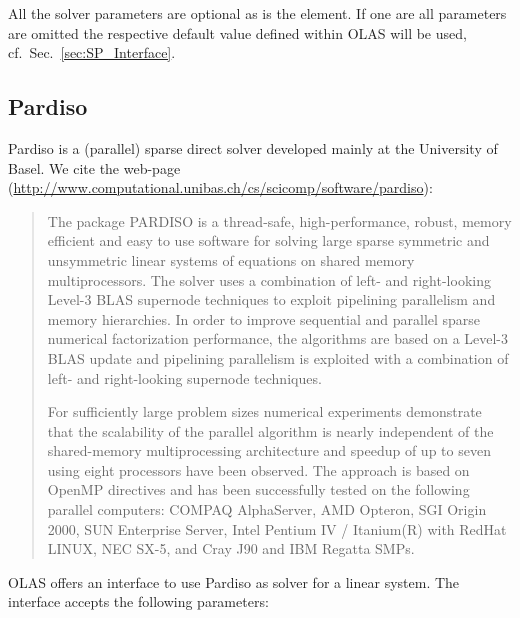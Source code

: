 All the solver parameters are optional as is the  element. If one are
all parameters are omitted the respective default value defined within OLAS
will be used, cf.~Sec.~\ref{sec:SP_Interface}.
%
%
\subsection{Pardiso}
%
%
Pardiso is a (parallel) sparse direct solver developed mainly at the University
of Basel. We cite the web-page
(\url{http://www.computational.unibas.ch/cs/scicomp/software/pardiso}):
%
%
\begin{quote}
The package PARDISO is a thread-safe, high-performance, robust, memory efficient and easy to use software for solving large sparse symmetric and unsymmetric linear systems of equations on shared memory multiprocessors. The solver uses a combination of left- and right-looking Level-3 BLAS supernode techniques to exploit pipelining parallelism and memory hierarchies. In order to improve sequential and parallel sparse numerical factorization performance, the algorithms are based on a Level-3 BLAS update and pipelining parallelism is exploited with a combination of left- and right-looking supernode techniques.

For sufficiently large problem sizes numerical experiments demonstrate that the scalability of the parallel algorithm is nearly independent of the shared-memory multiprocessing architecture and speedup of up to seven using eight processors have been observed. The approach is based on OpenMP directives and has been successfully tested on the following parallel computers: COMPAQ AlphaServer, AMD Opteron, SGI Origin 2000, SUN Enterprise Server, Intel Pentium IV / Itanium(R) with RedHat LINUX, NEC SX-5, and Cray J90 and IBM Regatta SMPs.
\end{quote}
%
%
OLAS offers an interface to use Pardiso as solver for a linear system. The
interface accepts the following parameters:
%
%
